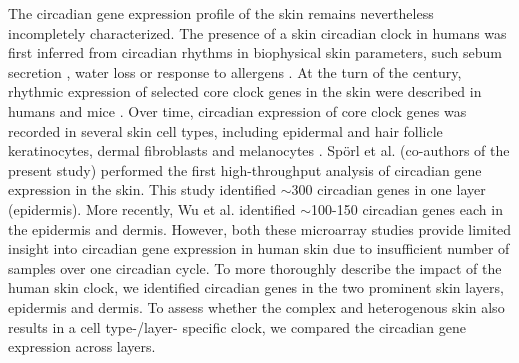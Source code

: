 The circadian gene expression profile of the skin remains nevertheless incompletely characterized. The presence of a skin circadian clock in humans was first inferred from circadian rhythms in biophysical skin parameters, such sebum secretion \cite{Burton1970}, water loss \cite{Spruit1971} or response to allergens \cite{Reinberg1965}. At the turn of the century, rhythmic expression of selected core clock genes in the skin were described in humans \cite{Bjarnason2001} and mice \cite{Oishi2002}. Over time, circadian expression of core clock genes was recorded in several skin cell types, including epidermal and hair follicle keratinocytes, dermal fibroblasts and melanocytes \cite{Zanello2000, Kawara2002, Brown2005, Brown2008,Spoerl2011}. Sp\"orl et al. (co-authors of the present study) \cite{Spoerl2012} performed the first high-throughput analysis of circadian gene expression in the skin. This study identified $\sim$300 circadian genes in one layer (epidermis). More recently, Wu et al. \cite{Wu2018,Wu2020} identified $\sim$100-150 circadian genes each in the epidermis and dermis. However, both these microarray studies provide limited insight into circadian gene expression in human skin due to insufficient number of samples over one circadian cycle. To more thoroughly describe the impact of the human skin clock, we identified circadian genes in the two prominent skin layers, epidermis and dermis. To assess whether the complex and heterogenous skin also results in a cell type-/layer- specific clock, we compared the circadian gene expression across layers. 

